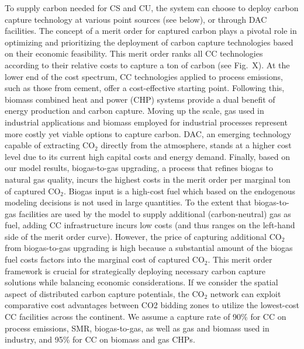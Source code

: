 \documentclass[twocolumn]{article}
\newcommand{\carbon}{CO$_2$}
\begin{document}
To supply carbon needed for CS and CU, the system can choose to deploy carbon capture technology at various point sources (see below), or through DAC facilities. The concept of a merit order for captured carbon plays a pivotal role in optimizing and prioritizing the deployment of carbon capture technologies based on their economic feasibility. This merit order ranks all CC technologies according to their relative costs to capture a ton of carbon (see Fig.~X). At the lower end of the cost spectrum, CC technologies applied to process emissions, such as those from cement, offer a cost-effective starting point. Following this, biomass combined heat and power (CHP) systems provide a dual benefit of energy production and carbon capture. Moving up the scale, gas used in industrial applications and biomass employed for industrial processes represent more costly yet viable options to capture carbon. DAC, an emerging technology capable of extracting \carbon{} directly from the atmosphere, stands at a higher cost level due to its current high capital costs and energy demand. Finally, based on our model results, biogas-to-gas upgrading, a process that refines biogas to natural gas quality, incurs the highest costs in the merit order per marginal ton of captured \carbon{}. Biogas input is a high-cost fuel which based on the endogenous modeling decisions is not used in large quantities. To the extent that biogas-to-gas facilities are used by the model to supply additional (carbon-neutral) gas as fuel, adding CC infrastructure incurs low costs (and thus ranges on the left-hand side of the merit order curve). However, the price of capturing additional \carbon{} from biogas-to-gas upgrading is high because a substantial amount of the biogas fuel costs factors into the marginal cost of captured \carbon{}. This merit order framework is crucial for strategically deploying necessary carbon capture solutions while balancing economic considerations. If we consider the spatial aspect of distributed carbon capture potentials, the \carbon{} network can exploit comparative cost advantages between CO2 bidding zones to utilize the lowest-cost CC facilities across the continent. We assume a capture rate of 90\% for CC on process emissions, SMR, biogas-to-gas, as well as gas and biomass used in industry, and 95\% for CC on biomass and gas CHPs.
\end{document}
